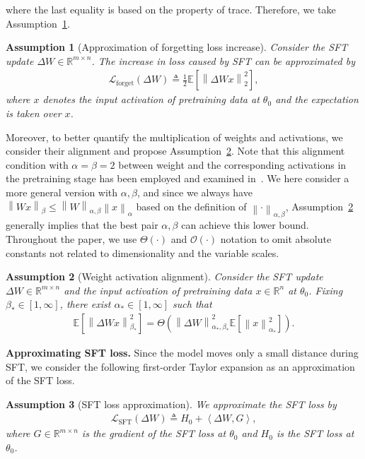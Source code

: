 \documentclass{article}
\newtheorem{assumption}{Assumption}
\theoremstyle{remark}
\newcommand{\Norm}[1]{\left\|#1\right\|}
\newcommand{\dotprod}[2]{\left\langle#1,#2\right\rangle}
\newcommand{\EE}{\mathbb{E}}
\newcommand{\cO}{\mathcal{O}}
\newcommand{\RR}{\mathbb{R}}
\newcommand{\cL}{\mathcal{L}}
\newcommand{\Lforget}{\mathcal{L}_{\mathrm{forget}}}
\begin{document}
where the last equality is based on the property of trace.
Therefore, we take Assumption~\ref{asm:forgetting_loss}.
\begin{assumption}[Approximation of forgetting loss increase]\label{asm:forgetting_loss}
    Consider the SFT update $\Delta W \in \RR^{m\times n}$. The increase in loss caused by SFT can be approximated by
    \begin{align}\label{eq:asm_loss_forget}
        \Lforget(\Delta W) \triangleq \frac{1}{2} \EE\left[ \Norm{\Delta W x}_{2}^2 \right] ,
    \end{align}
    where $x$ denotes the input activation of pretraining data at $\theta_0$ and the expectation is taken over $x$.
\end{assumption}

Moreover, to better quantify the multiplication of weights and activations, we consider their alignment and propose Assumption~\ref{asm:weight_activation_alignment}. Note that this alignment condition with $\alpha=\beta=2$ between weight and the corresponding activations in the pretraining stage has been employed and examined in~\citet{yang2023spectral}. We here consider a more general version with $\alpha,\beta$, and since we always have $\Norm{Wx}_\beta \le \Norm{W}_{\alpha,\beta} \Norm{x}_\alpha$ based on the definition of $\Norm{\cdot}_{\alpha,\beta}$, Assumption~\ref{asm:weight_activation_alignment} generally implies that the best pair $\alpha,\beta$ can achieve this lower bound. 
Throughout the paper, we use $\Theta(\cdot)$ and $\cO(\cdot)$ notation to omit absolute constants not related to dimensionality and the variable scales.

\begin{assumption}[Weight activation alignment]\label{asm:weight_activation_alignment}
    Consider the SFT update $\Delta W \in \RR^{m\times n}$ and the input activation of pretraining data $x \in \RR^{n}$ at $\theta_0$. Fixing $\beta_*\in [1,\infty]$, there exist $\alpha_* \in [1,\infty]$ such that
    \begin{align*}
        \EE\left[ \Norm{\Delta Wx}_{\beta_*}^2 \right] = \Theta\left( \Norm{\Delta W}_{\alpha_*,\beta_*}^2 \EE\left[ \Norm{x}_{\alpha_*}^2 \right] \right) .
    \end{align*}
\end{assumption}




\textbf{Approximating SFT loss.} Since the model moves only a small distance during SFT, we consider the following first-order Taylor expansion as an approximation of the SFT loss.
\begin{assumption}[SFT loss approximation]\label{asm:sft_loss}
    We approximate the SFT loss by
    \begin{align*}
        \cL_{\mathrm{SFT}}(\Delta W) \triangleq H_0 + \dotprod{\Delta W}{G} ,
    \end{align*}
    where $G \in \RR^{m\times n}$ is the gradient of the SFT loss at $\theta_0$ and $H_0$ is the SFT loss at $\theta_0$.
\end{assumption}
\end{document}
